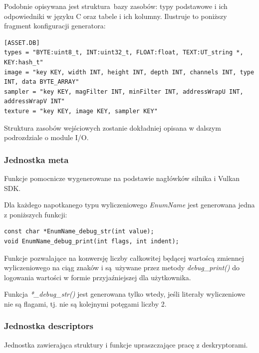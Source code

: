 Podobnie opisywana jest struktura bazy zasobów: typy podstawowe i ich odpowiedniki w języku C oraz tabele i ich kolumny. Ilustruje to poniższy fragment konfiguracji generatora:
\lstset{language=verbatim}
\begin{lstlisting}[caption={Fragment konfiguracji generatora opisujący strukturę bazy zasobów},captionpos=b]
[ASSET.DB]
types = "BYTE:uint8_t, INT:uint32_t, FLOAT:float, TEXT:UT_string *, KEY:hash_t"
image = "key KEY, width INT, height INT, depth INT, channels INT, type INT, data BYTE_ARRAY"
sampler = "key KEY, magFilter INT, minFilter INT, addressWrapU INT, addressWrapV INT"
texture = "key KEY, image KEY, sampler KEY"
\end{lstlisting}

Struktura zasobów wejściowych zostanie dokładniej opisana w dalszym podrozdziale o module I/O.

\subsubsection{Jednostka meta}
Funkcje pomocnicze wygenerowane na podstawie nagłówków silnika i Vulkan SDK.

Dla każdego napotkanego typu wyliczeniowego \textit{EnumName} jest generowana jedna z poniższych funkcji:
\lstset{language=C}
\begin{lstlisting}[caption={Wygenerowane funkcje dla typów wyliczeniowych},captionpos=b]
const char *EnumName_debug_str(int value);
void EnumName_debug_print(int flags, int indent);
\end{lstlisting}
Funkcje pozwalające na konwersję liczby całkowitej będącej wartoścą zmiennej wyliczeniowego na ciąg znaków i są używane przez metody \textit{debug\_print()} do logowania wartości w formie przyjaźniejszej dla użytkownika.

Funkcja \textit{*\_debug\_str()} jest generowana tylko wtedy, jeśli literały wyliczeniowe nie są flagami, tj. nie są kolejnymi potęgami liczby 2.


\subsubsection{Jednostka descriptors}
Jednostka zawierająca struktury i funkcje upraszczające pracę z deskryptorami.

